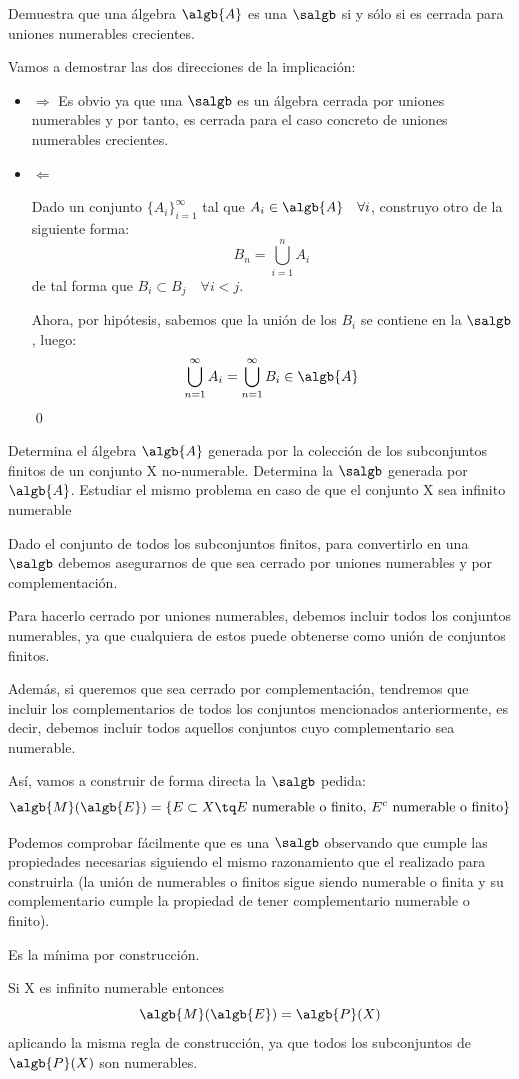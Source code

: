\begin{problem}[6]
Demuestra que una álgebra $\algb{A}$ es una $\salgb$ si y sólo si es cerrada para uniones numerables crecientes.

\solution
Vamos a demostrar las dos direcciones de la implicación:
\begin{itemize}
\item $\Rightarrow$
Es obvio ya que una $\salgb$ es un álgebra cerrada por uniones numerables y por tanto, es cerrada para el caso concreto de uniones numerables crecientes.
\item $\Leftarrow$

Dado un conjunto $\{A_i\}_{i=1}^{\infty}$ tal que $A_i \in \algb{A} \quad \forall i$, construyo otro de la siguiente forma:
\[B_n = \bigcup_{i=1}^{n} A_i\]
de tal forma que $B_i \subset B_j \quad \forall i<j$.

Ahora, por hipótesis, sabemos que la unión de los $B_i$ se contiene en la $\salgb$, luego:
\[\bigcup_{n=1}^{\infty} A_i=\bigcup_{n=1}^{\infty} B_i \in \algb{A}\]\qed

\end{itemize}
\end{problem}

\begin{problem}[7]
Determina el álgebra $\algb{A}$ generada por la colección de los subconjuntos finitos de un conjunto X no-numerable. Determina la $\salgb$ generada por $\algb{A}$. Estudiar el mismo problema en caso de que el conjunto X sea infinito numerable

\solution
Dado el conjunto de todos los subconjuntos finitos, para convertirlo en una $\salgb$ debemos asegurarnos de que sea cerrado por uniones numerables y por complementación.

Para hacerlo cerrado por uniones numerables, debemos incluir todos los conjuntos numerables, ya que cualquiera de estos puede obtenerse como unión de conjuntos finitos.

Además, si queremos que sea cerrado por complementación, tendremos que incluir los complementarios de todos los conjuntos mencionados anteriormente, es decir, debemos incluir todos aquellos conjuntos cuyo complementario sea numerable.

Así, vamos a construir de forma directa la $\salgb$ pedida:
\[\algb{M}(\algb{E})=\{ E\subset X \tq E \text{ numerable o finito, } E^c \text{ numerable o finito}\}\]

Podemos comprobar fácilmente que es una $\salgb$ observando que cumple las propiedades necesarias siguiendo el mismo razonamiento que el realizado para construirla (la unión de numerables o finitos sigue siendo numerable o finita y su complementario cumple la propiedad de tener complementario numerable o finito).

Es la mínima por construcción.

Si X es infinito numerable entonces
\[\algb{M}(\algb{E})=\algb{P}(X)\]
aplicando la misma regla de construcción, ya que todos los subconjuntos de $\algb{P}(X)$ son numerables.
\end{problem}

